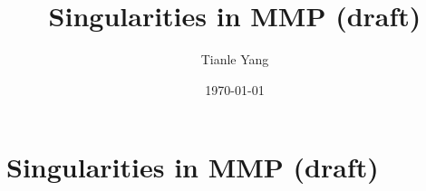 \documentclass{noteformyself}
\title{Singularities in MMP (draft)}
\author{Tianle Yang}
\date{\today}
\begin{document}
    \maketitle

    \section{Singularities in MMP (draft)}



\end{document}
